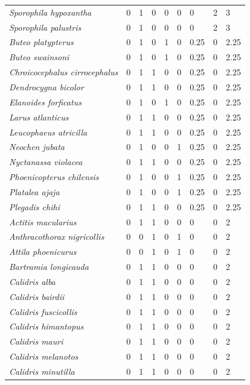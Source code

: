 \documentclass[
  oneside]{scrbook}
\begin{document}
\begin{ThreePartTable}
\begin{longtable}[t]{>{}lrrrrrlrl}
\addlinespace
\em{Sporophila hypoxantha} & 0 & 1 & 0 & 0 & 0 & 0 & 2 & 3\\
\em{Sporophila palustris} & 0 & 1 & 0 & 0 & 0 & 0 & 2 & 3\\
\em{Buteo platypterus} & 0 & 1 & 0 & 1 & 0 & 0.25 & 0 & 2.25\\
\em{Buteo swainsoni} & 0 & 1 & 0 & 1 & 0 & 0.25 & 0 & 2.25\\
\em{Chroicocephalus cirrocephalus} & 0 & 1 & 1 & 0 & 0 & 0.25 & 0 & 2.25\\
\addlinespace
\em{Dendrocygna bicolor} & 0 & 1 & 1 & 0 & 0 & 0.25 & 0 & 2.25\\
\em{Elanoides forficatus} & 0 & 1 & 0 & 1 & 0 & 0.25 & 0 & 2.25\\
\em{Larus atlanticus} & 0 & 1 & 1 & 0 & 0 & 0.25 & 0 & 2.25\\
\em{Leucophaeus atricilla} & 0 & 1 & 1 & 0 & 0 & 0.25 & 0 & 2.25\\
\em{Neochen jubata} & 0 & 1 & 0 & 0 & 1 & 0.25 & 0 & 2.25\\
\addlinespace
\em{Nyctanassa violacea} & 0 & 1 & 1 & 0 & 0 & 0.25 & 0 & 2.25\\
\em{Phoenicopterus chilensis} & 0 & 1 & 0 & 0 & 1 & 0.25 & 0 & 2.25\\
\em{Platalea ajaja} & 0 & 1 & 0 & 0 & 1 & 0.25 & 0 & 2.25\\
\em{Plegadis chihi} & 0 & 1 & 1 & 0 & 0 & 0.25 & 0 & 2.25\\
\em{Actitis macularius} & 0 & 1 & 1 & 0 & 0 & 0 & 0 & 2\\
\addlinespace
\em{Anthracothorax nigricollis} & 0 & 0 & 1 & 0 & 1 & 0 & 0 & 2\\
\em{Attila phoenicurus} & 0 & 0 & 1 & 0 & 1 & 0 & 0 & 2\\
\em{Bartramia longicauda} & 0 & 1 & 1 & 0 & 0 & 0 & 0 & 2\\
\em{Calidris alba} & 0 & 1 & 1 & 0 & 0 & 0 & 0 & 2\\
\em{Calidris bairdii} & 0 & 1 & 1 & 0 & 0 & 0 & 0 & 2\\
\addlinespace
\em{Calidris fuscicollis} & 0 & 1 & 1 & 0 & 0 & 0 & 0 & 2\\
\em{Calidris himantopus} & 0 & 1 & 1 & 0 & 0 & 0 & 0 & 2\\
\em{Calidris mauri} & 0 & 1 & 1 & 0 & 0 & 0 & 0 & 2\\
\em{Calidris melanotos} & 0 & 1 & 1 & 0 & 0 & 0 & 0 & 2\\
\em{Calidris minutilla} & 0 & 1 & 1 & 0 & 0 & 0 & 0 & 2\\

\end{longtable}
\end{ThreePartTable}
\end{document}
